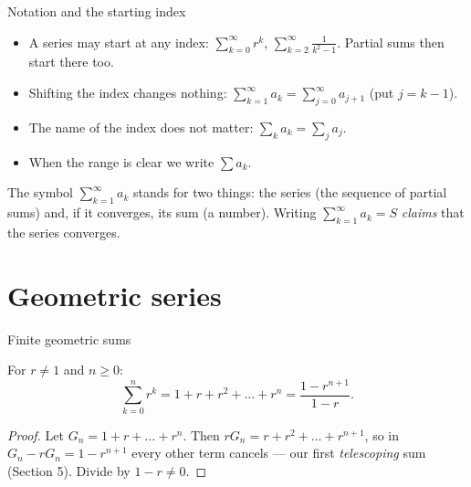 \documentclass{wosm-slides}
\begin{document}
\begin{frame}{Notation and the starting index}
  \begin{itemize}
    \item A series may start at any index:
      $\displaystyle\sum_{k=0}^{\infty} r^k$, \quad $\displaystyle\sum_{k=2}^{\infty} \frac{1}{k^2-1}$.
      Partial sums then start there too.
    \item Shifting the index changes nothing:
      $\displaystyle\sum_{k=1}^{\infty} a_k = \sum_{j=0}^{\infty} a_{j+1}$ \quad (put $j = k-1$).
    \item The name of the index does not matter: $\sum_k a_k = \sum_j a_j$.
    \item When the range is clear we write $\sum a_k$.
  \end{itemize}
  \begin{warning}
    The symbol $\sum_{k=1}^\infty a_k$ stands for two things: the series (the sequence of
    partial sums) and, if it converges, its sum (a number).
    Writing $\sum_{k=1}^\infty a_k = S$ \emph{claims} that the series converges.
  \end{warning}
\end{frame}

\section{Geometric series}

\begin{frame}{Finite geometric sums}
  \begin{lemma}
    For $r \ne 1$ and $n \ge 0$:
    \[ \sum_{k=0}^{n} r^k = 1 + r + r^2 + \dots + r^n = \frac{1 - r^{n+1}}{1 - r} . \]
  \end{lemma}
  \pause
  \begin{proof}
    Let $G_n = 1 + r + \dots + r^n$. Then $r G_n = r + r^2 + \dots + r^{n+1}$, so in
    $G_n - r G_n = 1 - r^{n+1}$ every other term cancels --- our first
    \emph{telescoping} sum (Section 5). Divide by $1 - r \ne 0$.
  \end{proof}
\end{frame}
\end{document}

